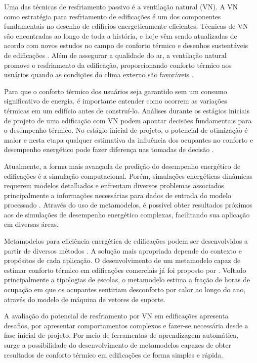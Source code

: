 \documentclass[brazil,hardcopy,openany,a5paper]{ufscthesis}
\begin{document}
	Uma das técnicas de resfriamento passivo é a ventilação natural (VN). A VN como estratégia para resfriamento de edificações é um dos componentes fundamentais no desenho de edifícios energeticamente eficientes. Técnicas de VN são encontradas ao longo de toda a história, e hoje vêm sendo atualizadas de acordo com novos estudos no campo de conforto térmico e desenhos sustentáveis de edificações \cite{Pesic2018}. Além de assegurar a qualidade do ar, a ventilação natural promove o resfriamento da edificação, proporcionando conforto térmico aos usuários quando as condições do clima externo são favoráveis \cite{Yao2009}.
	
	Para que o conforto térmico dos usuários seja garantido sem um consumo significativo de energia, é importante entender como ocorrem as variações térmicas em um edifício antes de construí-lo. Análises durante os estágios iniciais de projeto de uma edificação com VN podem apontar decisões fundamentais para o desempenho térmico. No estágio inicial de projeto, o potencial de otimização é maior e nesta etapa qualquer estimativa da influência dos ocupantes no conforto e desempenho energético pode fazer diferença nas tomadas de decisão \cite{Belleri2014}.
	
	Atualmente, a forma mais avançada de predição do desempenho energético de edificações é a simulação computacional. Porém, simulações energéticas dinâmicas requerem modelos detalhados e enfrentam diversos problemas associados principalmente a informações necessárias para dados de entrada do modelo processado \cite{Corgnati2013}. Através do uso de metamodelos, é possível obter resultados próximos aos de simulações de desempenho energético complexas, facilitando sua aplicação em diversas áreas.
	
	Metamodelos para eficiência energética de edificações podem ser desenvolvidos a partir de diversos métodos \cite{Ostergard2018}. A solução mais apropriada depende do contexto e propósitos de cada aplicação. O desenvolvimento de um metamodelo capaz de estimar conforto térmico em edificações comerciais já foi proposto por  \cite{Rackes2016}. Voltado principalmente a tipologias de escolas, o metamodelo estima a fração de horas de ocupação em que os ocupantes sentiriam desconforto por calor ao longo do ano, através do modelo de máquina de vetores de suporte.
	
	A avaliação do potencial de resfriamento por VN em edificações apresenta desafios, por apresentar comportamentos complexos e fazer-se necessária desde a fase inicial de projeto. Por meio de ferramentas de aprendizagem automática, surge a possibilidade do desenvolvimento de metamodelos capazes de obter resultados de conforto térmico em edificações de forma simples e rápida. 
	
\end{document}
